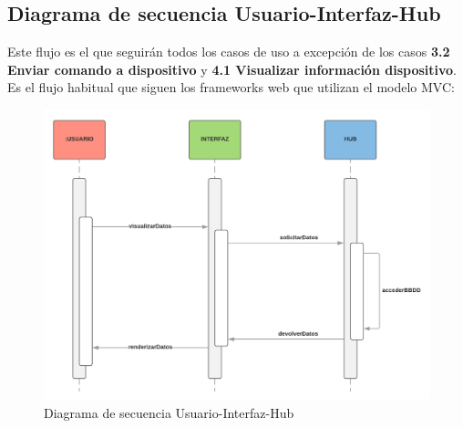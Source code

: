 \subsection{Diagrama de secuencia Usuario-Interfaz-Hub}
Este flujo es el que seguirán todos los casos de uso a excepción de los casos \textbf{3.2 Enviar comando a dispositivo} y \textbf{4.1 Visualizar información dispositivo}.
Es el flujo habitual que siguen los frameworks web que utilizan el modelo MVC:
\par
\begin{figure}[H]
\centering
\includegraphics[width=6.00in]{images/diagrama_secuencia_1.png}
\caption{Diagrama de secuencia Usuario-Interfaz-Hub}
\label{fig:diagrama_secuencia_1}
\end{figure}

